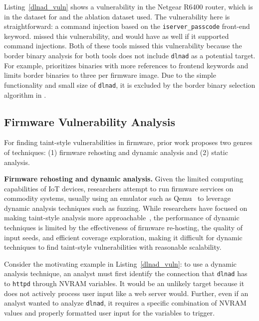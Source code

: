 \begin{code}
    \caption{Decompiled code of the \texttt{httpd} and \texttt{dlnad} binary from the Netgear R6400. \mango can identify this vulnerability while \karonte and \satc will not analyze \texttt{dlnad}.}
    \label{dlnad_vuln}
    
\end{code}


Listing~\ref{dlnad_vuln} shows a vulnerability in the Netgear R6400 router, which is in the dataset for \karonte and the ablation dataset \satc used.
The vulnerability here is straightforward: a command injection based on the \texttt{iserver\_passcode} front-end keyword.
\satc missed this vulnerability, and \karonte would have as well if it supported command injections.
Both of these tools missed this vulnerability because the border binary analysis for both tools does not include \texttt{dlnad} as a potential target.
For example, \satc prioritizes binaries with more references to frontend keywords and limits border binaries to three per firmware image.
Due to the simple functionality and small size of \texttt{dlnad}, it is excluded by the border binary selection algorithm in \satc.

\subsection{Firmware Vulnerability Analysis}
\label{sec:observation}

For finding taint-style vulnerabilities in firmware, prior work proposes two genres of techniques:
(1) firmware rehosting and dynamic analysis and (2) static analysis.

\smallskip
\noindent
\textbf{Firmware rehosting and dynamic analysis.}
Given the limited computing capabilities of IoT devices, researchers attempt to run firmware services on commodity systems, usually using an emulator such as Qemu~\cite{qemu} to leverage dynamic analysis techniques such as fuzzing.
While researchers have focused on making taint-style analysis more approachable~\cite{clause2007dytan,ming2016straighttaint,ming2015taintpipe}, the performance of dynamic techniques is limited by the effectiveness of firmware re-hosting, the quality of input seeds, and efficient coverage exploration, making it difficult for dynamic techniques to find taint-style vulnerabilities with reasonable scalability.

Consider the motivating example in Listing~\ref{dlnad_vuln}: to use a dynamic analysis technique, an analyst must first identify the connection that \texttt{dlnad} has to \texttt{httpd} through NVRAM variables.
It would be an unlikely target because it does not actively process user input like a web server would.
Further, even if an analyst wanted to analyze \texttt{dlnad}, it requires a specific combination of NVRAM values and properly formatted user input for the variables to trigger.

